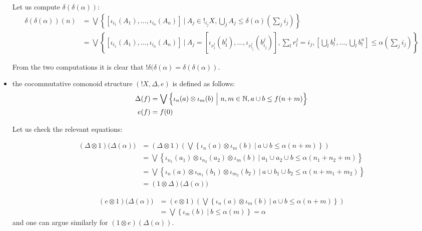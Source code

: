 \begin{itemize}
Let us compute $\delta(\delta(\alpha))$:
{\small
\begin{align*}
\delta(\delta(\alpha))(n) & = 
\bigvee\left \{
[\iota_{i_{1}}(A_{1}),\dots, \iota_{i_{n}}(A_{n})] \ \Bigg \vert \ 
A_{j}\in !_{i_{j}}X, \bigcup_{j}A_{j} \leq \delta(\alpha)(\sum_{j}i_{j})
\right\}\\
&=
\bigvee\left \{
[\iota_{i_{1}}(A_{1}),\dots, \iota_{i_{n}}(A_{n})] \ \Bigg \vert \ 
A_{j}= [\iota_{r_{1}^{j}}(b_{1}^{j}),\dots, \iota_{r_{s_{j}}^{j}}(b_{i_{j}}^{j})], 
\sum_{l} r_{l}^{j} = i_{j}, \left [\bigcup_{l}b_{l}^{1},\dots, \bigcup_{l}b_{l}^{n}\right ]\leq  \alpha(\sum_{j}i_{j})
\right\}
\end{align*}
}

From the two computations it is clear that $!\delta(\delta(\alpha)=\delta(\delta(\alpha))$. 

\item the cocommutative comonoid structure $(!X, \Delta, e)$ is  defined as follows:
{\small
\begin{align*}
\Delta(f)& = \bigvee
\left\{ \iota_{n}(a)\otimes \iota_{m}(b) \ \Big \vert \  
n,m\in \mathbb{N}, a\cup b\leq f(n+m)
\right\}\\
e(f)&= f(0)
\end{align*}
}

Let us check the relevant equations:

{\small
\begin{align*}
(\Delta\otimes 1)\Big(\Delta(\alpha)\Big)&=
(\Delta\otimes 1)\left (\bigvee\left \{\iota_{n}(a)\otimes \iota_{m}(b)\ \Big \vert \ a\cup b \leq \alpha(n+m)\right\}\right)\\
&= 
\bigvee\left \{\iota_{n_{1}}(a_{1})\otimes \iota_{n_{2}}(a_{2})\otimes \iota_{m}(b)\ \Big \vert \ a_{1}\cup a_{2}\cup b \leq \alpha(n_{1}+n_{2}+m)\right\}\\
&= 
\bigvee\left \{\iota_{n}(a)\otimes \iota_{m_{1}}(b_{1})\otimes \iota_{m_{2}}(b_{2})\ \Big \vert \ a\cup b_{1}\cup b_{2} \leq \alpha(n+m_{1}+m_{2})\right\}
\\
&= (1\otimes \Delta)\Big(\Delta(\alpha)\Big)
\end{align*}
}

{\small
\begin{align*}
(e\otimes 1)\Big(\Delta(\alpha)\Big) & = 
( e\otimes 1)\left (\bigvee\left \{\iota_{n}(a)\otimes \iota_{m}(b)\ \Big \vert \ a\cup b \leq \alpha(n+m)\right\}\right)\\
&= 
\bigvee\left \{\iota_{m}(b)\ \Big \vert \ b \leq \alpha(m)\right\} =
\alpha
\end{align*}
}
and one can argue similarly for $(1\otimes e)(\Delta(\alpha))$.


\end{itemize}
